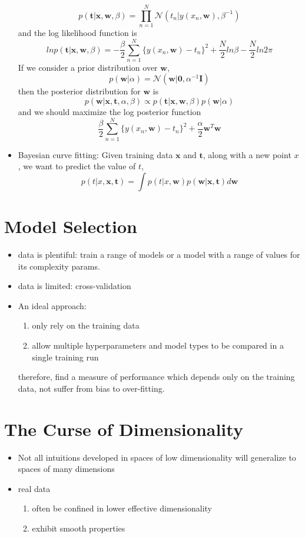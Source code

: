 \documentclass[UTF8]{article}
\begin{document}
\begin{itemize}
\[            p(\bm{t}|\bm{x},\bm{w},\beta)=\prod_{n=1}^N\mathcal{N}(t_n|y(x_n,\bm{w}),\beta^{-1})
            \]
        and the log likelihood function is 
        \[
            lnp(\bm{t}|\bm{x},\bm{w},\beta)=-\frac{\beta}{2}\sum_{n=1}^N\{y(x_n,\bm{w})-t_n\}^2
            +\frac{N}{2}ln\beta-\frac{N}{2}ln2\pi
            \]
        If we consider a prior distribution over $\bm{w}$,
        \[
            p(\bm{w}|\alpha)=\mathcal{N}(\bm{w}|\bm{0},\alpha^{-1}\bm{I})
            \]
        then the posterior distribution for $\bm{w}$ is 
        \[
            p(\bm{w}|\bm{x},\bm{t},\alpha,\beta)\propto p(\bm{t}|\bm{x},\bm{w},\beta)p(\bm{w}|\alpha)
            \]
        and we should maximize the log posterior function
        \[
            \frac{\beta}{2}\sum_{n=1}^N\{y(x_n,\bm{w})-t_n\}^2+\frac{\alpha}{2}\bm{w}^T\bm{w}
            \]
        \item Bayesian curve fitting: Given training data $\bm{x}$ and $\bm{t}$, along with a new
        point $x$, we want to predict the value of $t$, 
        \[
            p(t|x,\bm{x},\bm{t})=\int p(t|x,\bm{w})p(\bm{w}|\bm{x},\bm{t})d\bm{w}
            \]
    \end{itemize}
    \section{Model Selection}
    \begin{itemize}
        \item data is plentiful: train a range of models or a model with a range of values for its
        complexity params.
        \item  data is limited: cross-validation
        \item An ideal approach: 
        \begin{enumerate}
            \item only rely on the training data
            \item allow multiple hyperparameters and model types to be compared in a single 
            training run
        \end{enumerate}
        therefore, find a measure of performance which depends only on the training data, not
        suffer from bias to over-fitting.
    \end{itemize}
    \section{The Curse of Dimensionality}
    \begin{itemize}
        \item Not all intuitions developed in spaces of low dimensionality will generalize to 
        spaces of many dimensions
        \item real data 
        \begin{enumerate}
            \item often be confined in lower effective dimensionality
            \item exhibit smooth properties
        \end{enumerate}
    \end{itemize}
\end{document}
